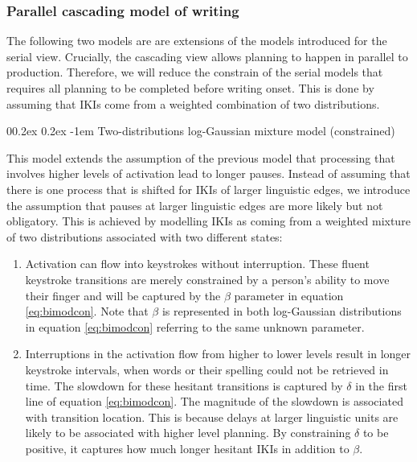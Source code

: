 \documentclass[
  english,
  man,floatsintext]{apa7}
\makeatletter
\let\oldparagraph\paragraph
\renewcommand{\paragraph}[1]{\oldparagraph{#1}\mbox{}}
\renewcommand{\paragraph}{\@startsection{paragraph}{4}{\parindent}%
  {0\baselineskip \@plus 0.2ex \@minus 0.2ex}%
  {-1em}%
  {\normalfont\normalsize\bfseries\itshape\typesectitle}}
\makeatother
\begin{document}
\begin{appendix}
\hypertarget{parallel-cascading-model-of-writing}{%
\subsubsection{Parallel cascading model of
writing}\label{parallel-cascading-model-of-writing}}

The following two models are are extensions of the models introduced for
the serial view. Crucially, the cascading view allows planning to happen
in parallel to production. Therefore, we will reduce the constrain of
the serial models that requires all planning to be completed before
writing onset. This is done by assuming that IKIs come from a weighted
combination of two distributions.

\hypertarget{two-distributions-log-gaussian-mixture-model-constrained}{%
\paragraph{Two-distributions log-Gaussian mixture model
(constrained)}\label{two-distributions-log-gaussian-mixture-model-constrained}}

This model extends the assumption of the previous model that processing
that involves higher levels of activation lead to longer pauses. Instead
of assuming that there is one process that is shifted for IKIs of larger
linguistic edges, we introduce the assumption that pauses at larger
linguistic edges are more likely but not obligatory. This is achieved by
modelling IKIs as coming from a weighted mixture of two distributions
associated with two different states:

\begin{enumerate}
\def\labelenumi{\arabic{enumi}.}
\item
  Activation can flow into keystrokes without interruption. These fluent
  keystroke transitions are merely constrained by a person's ability to
  move their finger and will be captured by the \(\beta\) parameter in
  equation \ref{eq:bimodcon}. Note that \(\beta\) is represented in both
  log-Gaussian distributions in equation \ref{eq:bimodcon} referring to
  the same unknown parameter.
\item
  Interruptions in the activation flow from higher to lower levels
  result in longer keystroke intervals, when words or their spelling
  could not be retrieved in time. The slowdown for these hesitant
  transitions is captured by \(\delta\) in the first line of equation
  \ref{eq:bimodcon}. The magnitude of the slowdown is associated with
  transition location. This is because delays at larger linguistic units
  are likely to be associated with higher level planning. By
  constraining \(\delta\) to be positive, it captures how much longer
  hesitant IKIs in addition to \(\beta\).
\end{enumerate}


\end{appendix}
\end{document}
